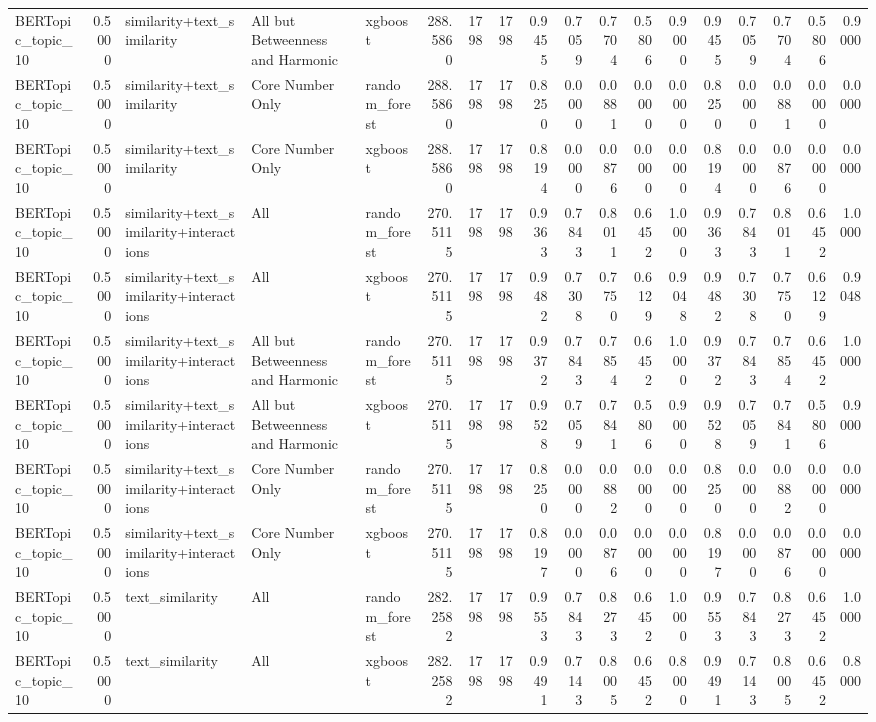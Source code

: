 \begin{tabular}{lrlllrrrrrrrrrrrrr}
BERTopic_topic_10 & 0.5000 & similarity+text_similarity & All but Betweenness and Harmonic & xgboost & 288.5860 & 1798 & 1798 & 0.9455 & 0.7059 & 0.7704 & 0.5806 & 0.9000 & 0.9455 & 0.7059 & 0.7704 & 0.5806 & 0.9000 \\
BERTopic_topic_10 & 0.5000 & similarity+text_similarity & Core Number Only & random_forest & 288.5860 & 1798 & 1798 & 0.8250 & 0.0000 & 0.0881 & 0.0000 & 0.0000 & 0.8250 & 0.0000 & 0.0881 & 0.0000 & 0.0000 \\
BERTopic_topic_10 & 0.5000 & similarity+text_similarity & Core Number Only & xgboost & 288.5860 & 1798 & 1798 & 0.8194 & 0.0000 & 0.0876 & 0.0000 & 0.0000 & 0.8194 & 0.0000 & 0.0876 & 0.0000 & 0.0000 \\
BERTopic_topic_10 & 0.5000 & similarity+text_similarity+interactions & All & random_forest & 270.5115 & 1798 & 1798 & 0.9363 & 0.7843 & 0.8011 & 0.6452 & 1.0000 & 0.9363 & 0.7843 & 0.8011 & 0.6452 & 1.0000 \\
BERTopic_topic_10 & 0.5000 & similarity+text_similarity+interactions & All & xgboost & 270.5115 & 1798 & 1798 & 0.9482 & 0.7308 & 0.7750 & 0.6129 & 0.9048 & 0.9482 & 0.7308 & 0.7750 & 0.6129 & 0.9048 \\
BERTopic_topic_10 & 0.5000 & similarity+text_similarity+interactions & All but Betweenness and Harmonic & random_forest & 270.5115 & 1798 & 1798 & 0.9372 & 0.7843 & 0.7854 & 0.6452 & 1.0000 & 0.9372 & 0.7843 & 0.7854 & 0.6452 & 1.0000 \\
BERTopic_topic_10 & 0.5000 & similarity+text_similarity+interactions & All but Betweenness and Harmonic & xgboost & 270.5115 & 1798 & 1798 & 0.9528 & 0.7059 & 0.7841 & 0.5806 & 0.9000 & 0.9528 & 0.7059 & 0.7841 & 0.5806 & 0.9000 \\
BERTopic_topic_10 & 0.5000 & similarity+text_similarity+interactions & Core Number Only & random_forest & 270.5115 & 1798 & 1798 & 0.8250 & 0.0000 & 0.0882 & 0.0000 & 0.0000 & 0.8250 & 0.0000 & 0.0882 & 0.0000 & 0.0000 \\
BERTopic_topic_10 & 0.5000 & similarity+text_similarity+interactions & Core Number Only & xgboost & 270.5115 & 1798 & 1798 & 0.8197 & 0.0000 & 0.0876 & 0.0000 & 0.0000 & 0.8197 & 0.0000 & 0.0876 & 0.0000 & 0.0000 \\
BERTopic_topic_10 & 0.5000 & text_similarity & All & random_forest & 282.2582 & 1798 & 1798 & 0.9553 & 0.7843 & 0.8273 & 0.6452 & 1.0000 & 0.9553 & 0.7843 & 0.8273 & 0.6452 & 1.0000 \\
BERTopic_topic_10 & 0.5000 & text_similarity & All & xgboost & 282.2582 & 1798 & 1798 & 0.9491 & 0.7143 & 0.8005 & 0.6452 & 0.8000 & 0.9491 & 0.7143 & 0.8005 & 0.6452 & 0.8000 \\

\end{tabular}
